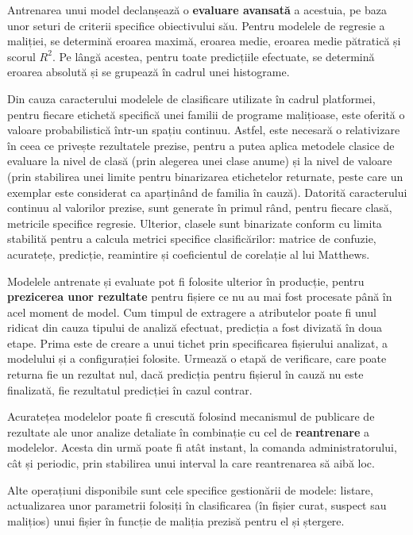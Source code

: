 \documentclass[../../main.tex]{subfiles}
\begin{document}
Antrenarea unui model declanșează o \textbf{evaluare avansată} a acestuia, pe baza unor seturi de criterii specifice obiectivului său. Pentru modelele de regresie a maliției, se determină eroarea maximă, eroarea medie, eroarea medie pătratică și scorul $ R^2 $. Pe lângă acestea, pentru toate predicțiile efectuate, se determină eroarea absolută și se grupează în cadrul unei histograme.

Din cauza caracterului modelele de clasificare utilizate în cadrul platformei, pentru fiecare etichetă specifică unei familii de programe malițioase, este oferită o valoare probabilistică într-un spațiu continuu. Astfel, este necesară o relativizare în ceea ce privește rezultatele prezise, pentru a putea aplica metodele clasice de evaluare la nivel de clasă (prin alegerea unei clase anume) și la nivel de valoare (prin stabilirea unei limite pentru binarizarea etichetelor returnate, peste care un exemplar este considerat ca aparținând de familia în cauză). Datorită caracterului continuu al valorilor prezise, sunt generate în primul rând, pentru fiecare clasă, metricile specifice regresie. Ulterior, clasele sunt binarizate conform cu limita stabilită pentru a calcula metrici specifice clasificărilor: matrice de confuzie, acuratețe, predicție, reamintire și coeficientul de corelație al lui Matthews.

Modelele antrenate și evaluate pot fi folosite ulterior în producție, pentru \textbf{prezicerea unor rezultate} pentru fișiere ce nu au mai fost procesate până în acel moment de model. Cum timpul de extragere a atributelor poate fi unul ridicat din cauza tipului de analiză efectuat, predicția a fost divizată în doua etape. Prima este de creare a unui tichet prin specificarea fișierului analizat, a modelului și a configurației folosite. Urmează o etapă de verificare, care poate returna fie un rezultat nul, dacă predicția pentru fișierul în cauză nu este finalizată, fie rezultatul predicției în cazul contrar.

Acuratețea modelelor poate fi crescută folosind mecanismul de publicare de rezultate ale unor analize detaliate în combinație cu cel de \textbf{reantrenare} a modelelor. Acesta din urmă poate fi atât instant, la comanda administratorului, cât și periodic, prin stabilirea unui interval la care reantrenarea să aibă loc.

Alte operațiuni disponibile sunt cele specifice gestionării de modele: listare, actualizarea unor parametrii folosiți în clasificarea (în fișier curat, suspect sau malițios) unui fișier în funcție de maliția prezisă pentru el și ștergere.
\end{document}
